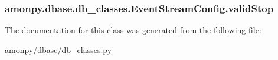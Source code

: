 \hypertarget{classamonpy_1_1dbase_1_1db__classes_1_1_event_stream_config_a55ef53af27e48c213db7b409c5459237}{
\subsubsection[{valid\-Stop}]{\setlength{\rightskip}{0pt plus 5cm}amonpy.\-dbase.\-db\-\_\-classes.\-Event\-Stream\-Config.\-valid\-Stop}}\label{classamonpy_1_1dbase_1_1db__classes_1_1_event_stream_config_a55ef53af27e48c213db7b409c5459237}


The documentation for this class was generated from the following file\-:\begin{DoxyCompactItemize}
\item 
amonpy/dbase/\hyperlink{db__classes_8py}{db\-\_\-classes.\-py}\end{DoxyCompactItemize}
